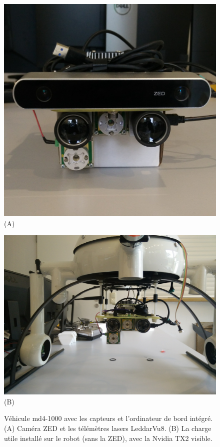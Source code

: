 \begin{figure}[htp]
  \centering
  \begin{minipage}{0.45\textwidth}
    \centering
    \includegraphics[width=\linewidth]{images/payload.jpg}
    (A)
  \end{minipage}
  \begin{minipage}{0.45\textwidth}
    \centering
    \includegraphics[width=\linewidth]{images/payload2.jpg}
    (B)
  \end{minipage}
  \caption{Véhicule md4-1000 avec les capteurs et l'ordinateur de bord intégré. (A) Caméra ZED et les télémètres lasers LeddarVu8. (B) La charge utile installé sur le robot (sans la ZED), avec la Nvidia TX2 visible.}
  \label{fig:field_vehicle}
\end{figure}

